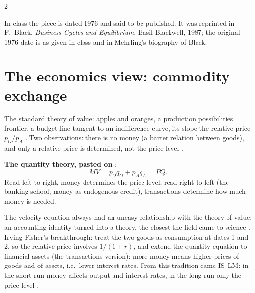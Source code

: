 \begin{paracol}{2}
\begin{coursenote}
In class the piece is dated 1976 and said to be published. It was reprinted in F.~Black, \emph{Business Cycles and Equilibrium}, Basil Blackwell, 1987; the original
1976 date is as given in class and in Mehrling's biography of Black.
\end{coursenote}

\section{The economics view: commodity exchange}\label{sec:tv-econ}

The standard theory of value: apples and oranges, a production possibilities frontier, a budget line tangent to an indifference curve, its slope the relative price
$p_O/p_A$ . Two observations: there is no money (a barter relation between goods), and only a relative price is
determined, not the price level .

\begin{keyformulas}
\textbf{The quantity theory, pasted on} :
\[
  MV = p_O q_O + p_A q_A = PQ .
\]
Read left to right, money determines the price level; read right to left (the banking school, money as endogenous credit), transactions determine how much money is needed.
\end{keyformulas}

The velocity equation always had an uneasy relationship with the theory of value: an accounting identity turned into a theory, the closest the field came to science
. Irving Fisher's breakthrough: treat the two goods as consumption at dates 1 and 2, so the relative price involves $1/(1+r)$, and extend
the quantity equation to financial assets (the transactions version): more money means higher prices of goods and of assets, i.e.\ lower interest rates. From this tradition
came IS--LM: in the short run money affects output and interest rates, in the long run only the price level .


\end{paracol}
